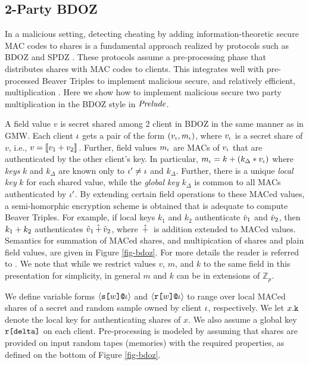 \subsection{2-Party BDOZ}



In a malicious setting, detecting cheating by adding
information-theoretic secure MAC codes to shares is a fundamental approach
realized by protocols such as BDOZ \cite{XXX} and SPDZ \cite{XXX}.
These protocols assume a pre-processing phase that distributes shares
with MAC codes to clients.  This integrates well with pre-processed
Beaver Triples to implement malicious secure, and relatively
efficient, multiplication \cite{XXX}.  Here we show how to implement
malicious secure two party multiplication in the BDOZ style in
$\mathit{Prelude}$. 

A field value $v$ is secret shared among 2 client in BDOZ in
the same manner as in GMW.
Each client $\iota$ gets a pair of the form $(v_\iota,m_\iota)$, where
$v_\iota$ is a secret share of $v$, i.e., $v = \llbracket v_1 + v_2 \rrbracket_{}$.
Further, field values $m_\iota$ are MACs of $v_\iota$ that are authenticated
by the other client's key. In particular, $m_\iota = k + (k_\Delta *
v_\iota)$ where \emph{keys} $k$ and $k_\Delta$ are known only to $\iota'
\ne \iota$ and $k_\Delta$. Further, there is a unique \emph{local key}
$k$ for each shared value, while the \emph{global key} $k_\Delta$ is
common to all MACs authenticated by $\iota'$. By extending certain
field operations to these MACed values, a semi-homorphic encryption
scheme is obtained that is adequate to compute Beaver Triples. For
example, if local keys $k_1$ and $k_2$ authenticate $\hat{v}_1$ and
$\hat{v}_2$, then $k_1 + k_2$ authenticates $\hat{v}_1 \,\hat{+}\,
\hat{v}_2$, where $\,\hat{+}\,$ is addition extended to MACed
values. Semantics for summation of MACed shares, and multipication of
shares and plain field values, are given in Figure \ref{fig-bdoz}.
For more details the reader is referred to \cite{XXX}. We note
that while we restrict values $v$, $m$, and $k$ to the same
field in this presentation for simplicity, in general $m$ and
$k$ can be in extensions of $\mathbb{Z}_p$. 

We define variable forms $\langle \texttt{s[}w\texttt{]} \texttt{@}\iota \rangle$ and
$\langle \texttt{r[}w\texttt{]} \texttt{@}\iota \rangle$ to range over local MACed shares of a secret
and random sample owned by client $\iota$, respectively. We let
$x.\texttt{k}_{}$ denote the local key for authenticating shares of $x$.
We also assume a global key $\texttt{r[}\texttt{delta}\texttt{]}$ on each client.
Pre-processing is modeled by assuming that shares are provided on
input random tapes (memories) with the required properties, as defined
on the bottom of Figure \ref{fig-bdoz}.

